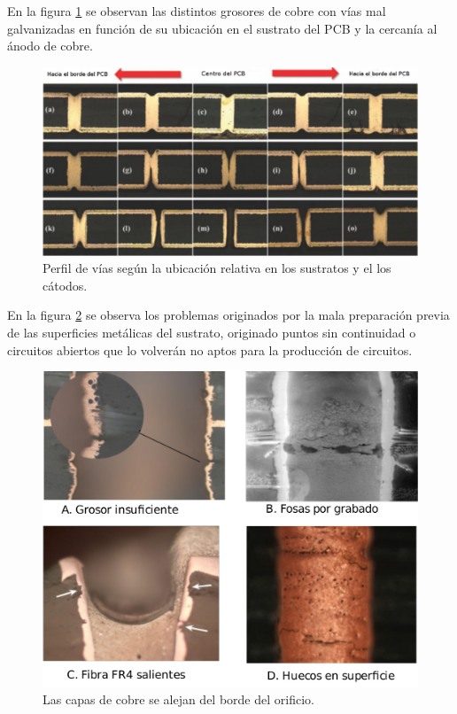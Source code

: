 En la figura \ref{fig:thr_incorrecto_perfil} se observan las distintos grosores de cobre con vías mal galvanizadas en función de su ubicación en el sustrato del PCB y la cercanía al ánodo de cobre.

\begin{figure}[h]
	\centering
	\includegraphics[width=.9\textwidth]{Figures/Cap_2/through_hole_perfil_fallado}
	\caption{Perfil de vías según la ubicación relativa en los sustratos y el los cátodos.}
	\label{fig:thr_incorrecto_perfil}
\end{figure}

En la figura \ref{fig:fallas_en_PTH} se observa los problemas originados por la mala preparación previa de las superficies metálicas del sustrato, originado puntos sin continuidad o circuitos abiertos que lo volverán no aptos para la producción de circuitos.

\begin{figure}[h]
	\centering
	\includegraphics[width=.8\textwidth]{Figures/Cap_2/fallas_en_PTH}
	\caption{ Las capas de cobre se alejan del borde del orificio.}
	\label{fig:fallas_en_PTH}
\end{figure}


